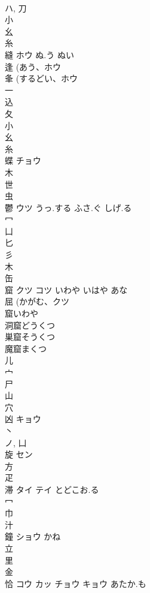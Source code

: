 \documentclass[8pt]{extreport}
\begin{document}
\begin{CJK}{UTF8}{min}
\\	ハ, 刀 
\\	小 
\\	幺 
\\	糸 
\\	縫	ホウ	ぬ.う ぬい	
\\	逢 (あう、ホウ 
\\	夆 (するどい、ホウ 
\\	一 
\\	込 
\\	夂 
\\	小 
\\	幺 
\\	糸 
\\	蝶	チョウ		
\\	木 
\\	世 
\\	虫 
\\	鬱	ウツ	うっ.する ふさ.ぐ しげ.る	
\\	冖 
\\	凵 
\\	匕 
\\	彡 
\\	木 
\\	缶 
\\	窟	クツ コツ	いわや いはや あな	
\\	屈 (かがむ、クツ 
\\	窟いわや 
\\	洞窟どうくつ 
\\	巣窟そうくつ 
\\	魔窟まくつ 
\\	儿 
\\	宀 
\\	尸 
\\	山 
\\	穴 
\\	凶	キョウ		
\\	丶 
\\	ノ, 凵 
\\	旋	セン		
\\	方 
\\	疋 
\\	滞	タイ テイ	とどこお.る	
\\	冖 
\\	巾 
\\	汁 
\\	鐘	ショウ	かね	
\\	立 
\\	里 
\\	金 
\\	恰	コウ カッ チョウ キョウ	あたか.も	

\end{CJK}
\end{document}
